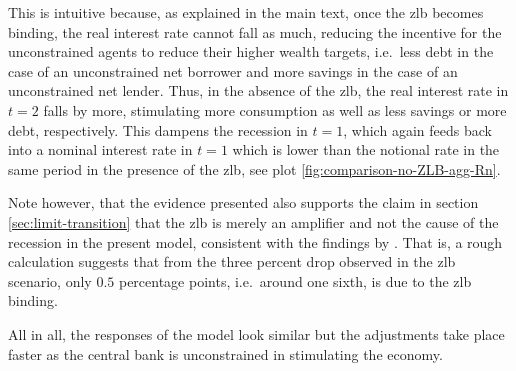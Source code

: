 \documentclass[a4paper,12pt]{article} %
\numberwithin{equation}{section} %
\numberwithin{figure}{section}
\numberwithin{table}{section}
\begin{document}
\begin{refsection}
\begin{appendices}
This is intuitive because, as explained in the main text, once the \Gls{zlb} becomes binding, the real interest rate cannot fall as much, reducing the incentive for the unconstrained agents to reduce their higher wealth targets, i.e.~less debt in the case of an unconstrained net borrower and more savings in the case of an unconstrained net lender. Thus, in the absence of the \Gls{zlb}, the real interest rate in $t=2$ falls by more, stimulating more consumption as well as less savings or more debt, respectively. This dampens the recession in $t=1$, which again feeds back into a nominal interest rate in $t=1$ which is lower than the notional rate in the same period in the presence of the \Gls{zlb}, see plot \ref{fig:comparison-no-ZLB-agg-Rn}.

Note however, that the evidence presented also supports the claim in section \ref{sec:limit-transition} that the \Gls{zlb} is merely an amplifier and not the cause of the recession in the present model, consistent with the findings by \textcite{gl2017}. That is, a rough calculation suggests that from the three percent drop observed in the \Gls{zlb} scenario, only $0.5$ percentage points, i.e.~around one sixth, is due to the \Gls{zlb} binding.

All in all, the responses of the model look similar but the adjustments take place faster as the central bank is unconstrained in stimulating the economy. 


\end{appendices}
\end{refsection}
\end{document}
